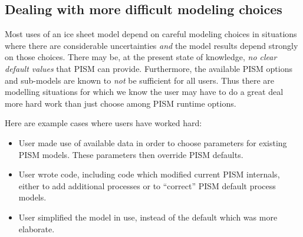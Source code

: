 \subsection{Dealing with more difficult modeling choices}
\label{subsec:hard-choices}

Most uses of an ice sheet model depend on careful modeling choices in situations where there are considerable uncertainties \emph{and} the model results depend strongly on those choices.  There may be, at the present state of knowledge, \emph{no clear default values} that PISM can provide.  Furthermore, the available PISM options and sub-models are known to \emph{not} be sufficient for all users.  Thus there are modelling situations for which we know the user may have to do a great deal more hard work than just choose among PISM runtime options.

Here are example cases where users have worked hard:
\begin{itemize}
\item User made use of available data in order to choose parameters for existing PISM models.  These parameters then override PISM defaults.
\begin{center} %
\end{center}
\item User wrote code, including code which modified current PISM internals, either to add additional processes or to ``correct'' PISM default process models.
\begin{center} %
\end{center}
\item User simplified the model in use, instead of the default which was more elaborate.
\begin{center} %
\end{center}
\end{itemize}



